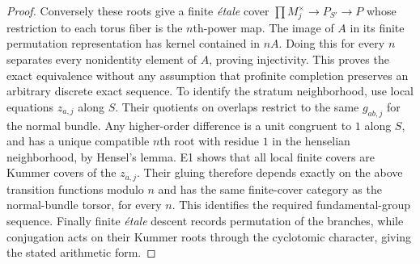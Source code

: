 \begin{proof}
Conversely these roots give a finite \emph{\'etale} cover $\prod M_j^\times\to P_{S'}\to P$ whose restriction to each torus fiber is the $n$th-power map. The image of $A$ in its finite permutation representation has kernel contained in $nA$. Doing this for every $n$ separates every nonidentity element of $A$, proving injectivity. This proves the exact equivalence without any assumption that profinite completion preserves an arbitrary discrete exact sequence.
To identify the stratum neighborhood, use local equations $z_{a,j}$ along $S$. Their quotients on overlaps restrict to the same $g_{ab,j}$ for the normal bundle. Any higher-order difference is a unit congruent to $1$ along $S$, and has a unique compatible $n$th root with residue $1$ in the henselian neighborhood, by Hensel's lemma. E1 shows that all local finite covers are Kummer covers of the $z_{a,j}$. Their gluing therefore depends exactly on the above transition functions modulo $n$ and has the same finite-cover category as the normal-bundle torsor, for every $n$. This identifies the required fundamental-group sequence. Finally finite \emph{\'etale} descent records permutation of the branches, while conjugation acts on their Kummer roots through the cyclotomic character, giving the stated arithmetic form.
\end{proof}

